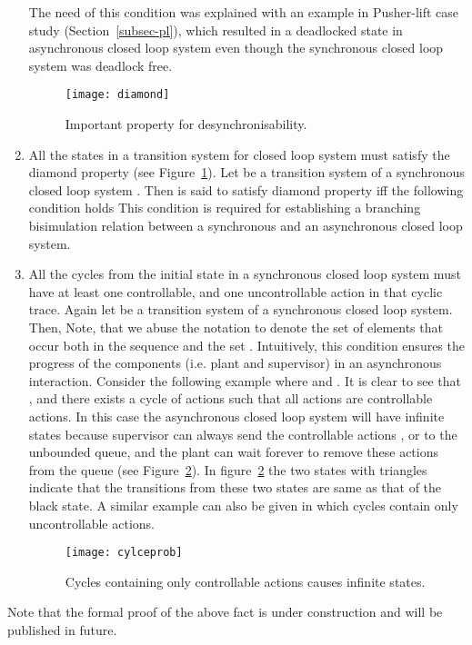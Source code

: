 \documentclass[a4paper,english,final]{article}
\theoremstyle{plain}
\theoremstyle{definition}
\begin{document}
\begin{enumerate}
    The need of this condition was explained with an example in Pusher-lift case study (Section~\ref{subsec-pl}), which resulted in a deadlocked state in asynchronous closed loop system even though the synchronous closed loop system was deadlock free.
\begin{figure}\centering
\texttt{[image: diamond]}
\caption{Important property for desynchronisability.}\label{diamond-fig}
\end{figure}
\item All the states in a transition system for closed loop system must satisfy the diamond property (see Figure~\ref{diamond-fig}). Let  be a transition system of a synchronous closed loop system . Then  is said to satisfy diamond property iff the following condition holds This condition is required for establishing a branching bisimulation relation between a synchronous and an asynchronous closed loop system.
\item All the cycles from the initial state in a synchronous closed loop system must have at least one controllable, and one uncontrollable action in that cyclic trace. Again let  be a transition system of a synchronous closed loop system. Then, 
Note, that we abuse the notation  to denote the set of elements that occur both in the sequence  and the set . Intuitively, this condition ensures the progress of the components (i.e. plant and supervisor) in an asynchronous interaction. Consider the following example where  and . It is clear to see that , and there exists a cycle of actions  such that all actions are controllable actions. In this case the asynchronous closed loop system will have infinite states because supervisor  can always send the controllable actions , or  to the unbounded queue, and the plant can wait forever to remove these actions from the queue (see Figure~\ref{cycleprob}). In figure~\ref{cycleprob} the two states with triangles indicate that the transitions from these two states are same as that of the black state. A similar example can also be given in which cycles contain only uncontrollable actions.
\begin{figure}\centering
\texttt{[image: cylceprob]}
\caption{Cycles containing only controllable actions causes infinite states.}\label{cycleprob}
\end{figure}
\end{enumerate}

Note that the formal proof of the above fact is under construction and will be published in future.
\end{document}
